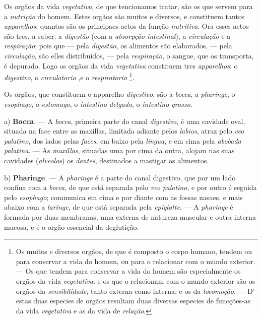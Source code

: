 Os orgãos da vida \emph{vegetativa}, de que tencionamos tratar, são os que servem para a \emph{nutrição} do homem. Estes orgãos são muitos e diversos, e   constituem tantos \emph{apparelhos}, quantos são os principaes actos da função \emph{nutritiva}. Ora esses actos são tres, a saber: a \emph{digestão} (com a \emph{absorpção intestinal}), a \emph{circulação} e a \emph{respiração}; pois que --- pela \emph{digestão}, os alimentos são elaborados, --- pela \emph{circulação}, são elles distribuidos, --- pela \emph{respiração}, o sangue, que os transporta, é depurado. Logo os orgãos da vida \emph{vegetativa} constituem tres \emph{apparelhos}: o \emph{digestivo}, o \emph{circulatorio} ,e o \emph{respiratorio} \footnote{Os muitos e diversos orgãos, de que é composto o corpo humano, tendem ou para conservar a vida do homem, ou para o relacionar com o mundo exterior. --- Os que tendem para conservar a vida do homem são especialmente os orgãos da vida \emph{vegetativa}: e os que o relacionam com o mundo exterior são os orgãos da \emph{sensibilidade}, tanto externa como interna, e os da \emph{locomoção}. --- D' estas duas especies de orgãos resultam duas diversas especies de funcções-as da vida \emph{vegetativa} e as da vida de \emph{relação}.}.


Os orgãos, que constituem o apparelho \emph{digestivo}, são a \emph{bocca}, a \emph{pharinge}, o \emph{esophago}, o \emph{estomago}, o \emph{intestino delgado}, o \emph{intestino grosso}.

a) \textbf{Bocca}. --- A \emph{bocca}, primeira parte do canal \emph{digestivo}, é uma cavidade oval, situada na face entre as maxillas, limitada adiante pelos \emph{labios}, atraz pelo \emph{veo palatino}, dos lados pelas \emph{faces}, em baixo pela \emph{lingua}, e em cima pela \emph{abobada palatina}. --- As \emph{maxillas}, situadas uma por cima da outra, alojam nas suas cavidades (\emph{alveolos}) os \emph{dentes}, destinados a mastigar os alimentos.

b) \textbf{Pharinge}. --- A \emph{pharinge} é a parte do canal digestivo, que por um lado confina com a \emph{bocca}, de que está separada pelo \emph{veo palatino}, e por outro é seguida pelo \emph{esophago}; communica em cima e por diante com as fossas nasaes, e mais abaixo com a \emph{laringe}, de que está separada pela \emph{epiglotte}. --- A \emph{pharinge} é formada por duas membranas, uma externa de natureza muscular e outra interna mucosa, e é o orgão essencial da deglutição.

